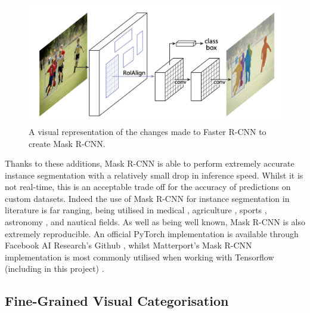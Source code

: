 \begin{figure}
	\begin{center}
		\includegraphics[scale=0.3]{Chapter2/figs/mask-r-cnn-changes.png}
	\end{center}
	\caption{A visual representation of the changes made to Faster R-CNN to create Mask R-CNN. \cite{he_mask_2017}}
	\label{fig:mask-r-cnn-changes}
\end{figure}

Thanks to these additions, Mask R-CNN is able to perform extremely accurate instance segmentation with a relatively small drop in inference speed. Whilst it is not real-time, this is an acceptable trade off for the accuracy of predictions on custom datasets. Indeed the use of Mask R-CNN for instance segmentation in literature is far ranging, being utilised in medical \cite{rohit_malhotra_autonomous_2018, chiao_detection_2019, liu_segmentation_2018, anantharaman_utilizing_2018}, agriculture \cite{qiao_cattle_2019, zhao_comparing_2018, lee_potato_2020, chu_deepapple_2020}, sports \cite{buric_ball_2018, pobar_detection_2019, nguyen_hand_2018}, astronomy \cite{burke_deblending_2019}, and nautical \cite{nie_inshore_2018, hong_trashcan_2020} fields. As well as being well known, Mask R-CNN is also extremely reproducible. An official PyTorch implementation is available through Facebook AI Research's Github \cite{wu_detectron2_2020}, whilst Matterport's Mask R-CNN implementation is most commonly utilised when working with Tensorflow (including in this project) \cite{waleed_mask_2017}.

\subsection{Fine-Grained Visual Categorisation}\label{ch:Background,sec:Fine-grainedCV}

